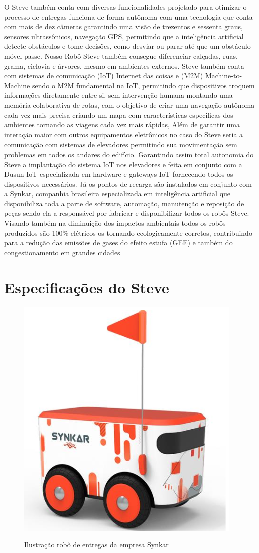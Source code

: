 O Steve também conta com diversas funcionalidades projetado para otimizar o processo de entregas funciona de forma autônoma com uma tecnologia que conta com mais de dez câmeras garantindo uma visão de trezentos e sessenta graus, sensores ultrassônicos, navegação GPS, permitindo que a inteligência artificial detecte obstáculos e tome decisões, como desviar ou parar até que um obstáculo móvel passe. Nosso Robô Steve também consegue diferenciar calçadas, ruas, grama, ciclovia e árvores, mesmo em ambientes externos. Steve também conta com sistemas de comunicação (IoT) Internet das coisas e (M2M) Machine-to-Machine sendo o M2M fundamental na IoT, permitindo que dispositivos troquem informações diretamente entre si, sem intervenção humana montando uma memória colaborativa de rotas, com o objetivo de criar uma navegação autônoma cada vez mais precisa criando um mapa com características especificas dos ambientes tornando as viagens cada vez mais rápidas, Além de garantir uma interação maior com outros equipamentos eletrônicos no caso do Steve seria a comunicação com sistemas de elevadores permitindo sua movimentação sem problemas em todos os andares do edifício. Garantindo assim total autonomia do Steve a implantação do sistema IoT nos elevadores e feita em conjunto com a Dusun IoT \cite{DusunIot} especializada em hardware e gateways IoT fornecendo todos os dispositivos necessários. Já os pontos de recarga são instalados em conjunto com a Synkar, companhia brasileira especializada em inteligência artificial que disponibiliza toda a parte de software, automação, manutenção e reposição de peças sendo ela a responsável por fabricar e disponibilizar todos os robôs Steve. Visando também na diminuição dos impactos ambientais todos os robôs produzidos são 100\% elétricos os tornando ecologicamente corretos, contribuindo para a redução das emissões de gases do efeito estufa (GEE) e também do congestionamento em grandes cidades \cite{Bakach2020}

\section{Especificações do Steve} 
\begin{figure} [!ht]
   { \centering
    \caption{Ilustração robô de entregas da empresa Synkar}
    \includegraphics[width=0.5\linewidth]{figuras/synkar.png}
    \label{fig:enter-label}
    }
\end{figure}

